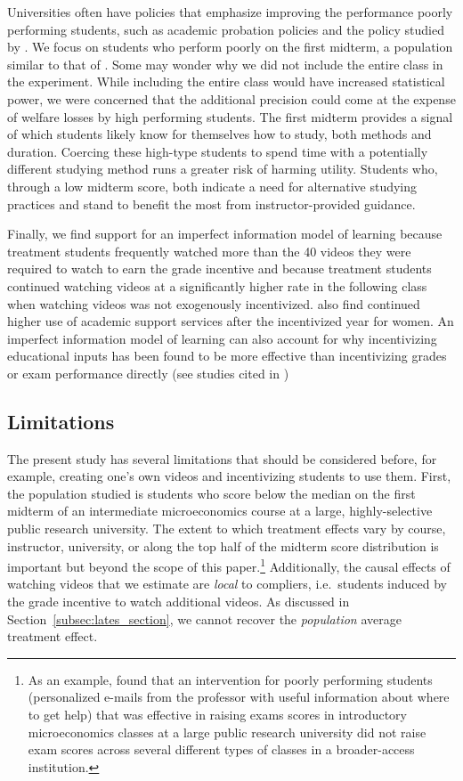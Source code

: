 \documentclass[12pt]{article}
\begin{document}
Universities often have policies that emphasize improving the performance poorly performing students, such as academic probation policies and the policy studied by \textcite{kow2020}.
We focus on students who perform poorly on the first midterm, a population similar to that of \textcite{dgm2010}.
Some may wonder why we did not include the entire class in the experiment.
While including the entire class would have increased statistical power, we were concerned that the additional precision could come at the expense of welfare losses by high performing students.
The first midterm provides a signal of which students likely know for themselves how to study, both methods and duration.
Coercing these high-type students to spend time with a potentially different studying method runs a greater risk of harming utility.
Students who, through a low midterm score, both indicate a need for alternative studying practices and stand to benefit the most from instructor-provided guidance.

Finally, we find support for an imperfect information model of learning because treatment students frequently watched more than the 40 videos they were required to watch to earn the grade incentive and because treatment students continued watching videos at a significantly higher rate in the following class when watching videos was not exogenously incentivized. \textcite{alo2009} also find continued higher use of academic support services after the incentivized year for women.
An imperfect information model of learning can also account for why incentivizing educational inputs has been found to be more effective than incentivizing grades or exam performance directly (see studies cited in \textcite{gmr2011})

\subsection{Limitations}\label{subsec:limitations}

The present study has several limitations that should be considered before, for example, creating one's own videos and incentivizing students to use them.
First, the population studied is students who score below the median on the first midterm of an intermediate microeconomics course at a large, highly-selective public research university.
The extent to which treatment effects vary by course, instructor, university, or along the top half of the midterm score distribution is important but beyond the scope of this paper.\footnote{As an example, \textcite{ck2020} found that an intervention for poorly performing students (personalized e-mails from the professor with useful information about where to get help) that was effective in raising exams scores in introductory microeconomics classes at a large public research university did not raise exam scores across several different types of classes in a broader-access institution.} Additionally, the causal effects of watching videos that we estimate are \textit{local} to compliers, i.e.\ students induced by the grade incentive to watch additional videos.
As discussed in Section~\ref{subsec:lates_section}, we cannot recover the \textit{population} average treatment effect.
\end{document}
